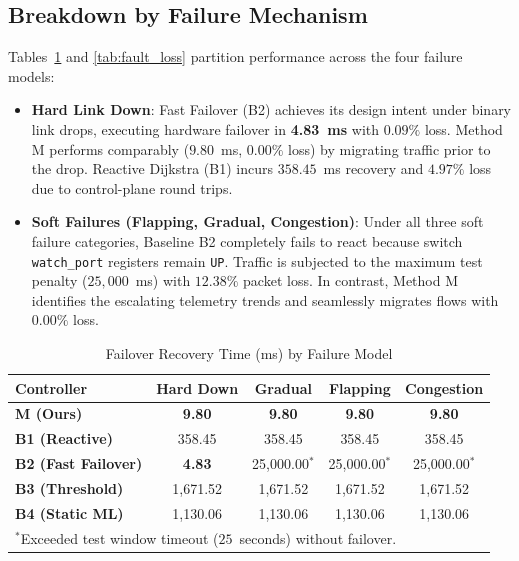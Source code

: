 \documentclass[10pt,twocolumn]{article}
\begin{document}
\subsection{Breakdown by Failure Mechanism}
Tables~\ref{tab:fault_recovery} and \ref{tab:fault_loss} partition performance across the four failure models:
\begin{itemize}
    \item \textbf{Hard Link Down}: Fast Failover (B2) achieves its design intent under binary link drops, executing hardware failover in \textbf{4.83~ms} with $0.09\%$ loss. Method M performs comparably ($9.80$~ms, $0.00\%$ loss) by migrating traffic prior to the drop. Reactive Dijkstra (B1) incurs $358.45$~ms recovery and $4.97\%$ loss due to control-plane round trips.
    \item \textbf{Soft Failures (Flapping, Gradual, Congestion)}: Under all three soft failure categories, Baseline B2 completely fails to react because switch \texttt{watch\_port} registers remain \texttt{UP}. Traffic is subjected to the maximum test penalty ($25{,}000$~ms) with $12.38\%$ packet loss. In contrast, Method M identifies the escalating telemetry trends and seamlessly migrates flows with $0.00\%$ loss.
\end{itemize}

\begin{table}[!t]
\centering
\caption{Failover Recovery Time (ms) by Failure Model}
\label{tab:fault_recovery}
\begin{tabular}{lcccc}
\toprule
\textbf{Controller} & \textbf{Hard Down} & \textbf{Gradual} & \textbf{Flapping} & \textbf{Congestion} \\
\midrule
\textbf{M (Ours)} & \textbf{9.80} & \textbf{9.80} & \textbf{9.80} & \textbf{9.80} \\
\textbf{B1 (Reactive)} & 358.45 & 358.45 & 358.45 & 358.45 \\
\textbf{B2 (Fast Failover)} & \textbf{4.83} & 25,000.00$^*$ & 25,000.00$^*$ & 25,000.00$^*$ \\
\textbf{B3 (Threshold)} & 1,671.52 & 1,671.52 & 1,671.52 & 1,671.52 \\
\textbf{B4 (Static ML)} & 1,130.06 & 1,130.06 & 1,130.06 & 1,130.06 \\
\bottomrule
\multicolumn{5}{l}{$^*$Exceeded test window timeout ($25$~seconds) without failover.}
\end{tabular}
\end{table}
\end{document}
